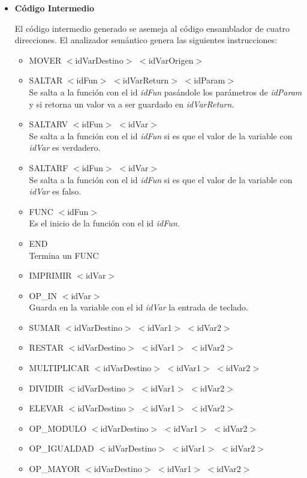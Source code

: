 \documentclass[a4paper,12pt]{article}
\begin{document}
\begin{enumerate}
\begin{enumerate}
\begin{itemize}
  \item \textbf{Código Intermedio}
  
  El código intermedio generado se asemeja al código ensamblador de cuatro direcciones. El analizador semántico genera las siguientes instrucciones:
  
  \begin{itemize}
   \item MOVER $<$idVarDestino$>$ $<$idVarOrigen$>$
   \item SALTAR $<$idFun$>$ $<$idVarReturn$>$ $<$idParam$>$ \\
	 Se salta a la función con el id \textit{idFun} pasándole los parámetros de \textit{idParam} y si retorna un valor va a ser guardado en \textit{idVarReturn}.
   \item SALTARV $<$idFun$>$ $<$idVar$>$ \\
	 Se salta a la función con el id \textit{idFun} si es que el valor de la variable con \textit{idVar} es verdadero.
   \item SALTARF $<$idFun$>$ $<$idVar$>$ \\
	 Se salta a la función con el id \textit{idFun} si es que el valor de la variable con \textit{idVar} es falso.
   \item FUNC $<$idFun$>$ \\
	 Es el inicio de la función con el id \textit{idFun}.
   \item END \\
         Termina un FUNC
   \item IMPRIMIR $<$idVar$>$
   \item OP\_IN $<$idVar$>$ \\
	 Guarda en la variable con el id \textit{idVar} la entrada de teclado.
   \item SUMAR $<$idVarDestino$>$ $<$idVar1$>$ $<$idVar2$>$
   \item RESTAR $<$idVarDestino$>$ $<$idVar1$>$ $<$idVar2$>$
   \item MULTIPLICAR $<$idVarDestino$>$ $<$idVar1$>$ $<$idVar2$>$
   \item DIVIDIR $<$idVarDestino$>$ $<$idVar1$>$ $<$idVar2$>$
   \item ELEVAR $<$idVarDestino$>$ $<$idVar1$>$ $<$idVar2$>$
   \item OP\_MODULO $<$idVarDestino$>$ $<$idVar1$>$ $<$idVar2$>$
   \item OP\_IGUALDAD $<$idVarDestino$>$ $<$idVar1$>$ $<$idVar2$>$
   \item OP\_MAYOR $<$idVarDestino$>$ $<$idVar1$>$ $<$idVar2$>$

\end{itemize}
\end{itemize}
\end{enumerate}
\end{enumerate}
\end{document}
